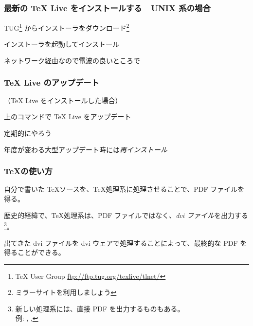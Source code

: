 \begin{frame}
	\frametitle{最新の {\TeX} Live をインストールする---UNIX 系の場合}
	TUG\footnote{{\TeX} User Group \url{ftp://ftp.tug.org/texlive/tlnet/}}
	からインストーラをダウンロード\footnote{ミラーサイトを利用しましょう}\\
	
	インストーラを起動してインストール\\
	
	ネットワーク経由なので電波の良いところで
\end{frame}

\begin{frame}
	\frametitle{{\TeX} Live のアップデート}
	（{\TeX} Live をインストールした場合）
	
	
	上のコマンドで {\TeX} Live をアップデート
	
	定期的にやろう
	
	年度が変わる大型アップデート時には\emph{再インストール}
\end{frame}


\begin{frame}
	\frametitle{\TeX の使い方}
	自分で書いた \TeX ソースを、\TeX 処理系に処理させることで、PDF ファイルを得る。\par
	\pause
	\par
	\pause
	歴史的経緯で、\TeX 処理系は、PDF ファイルではなく、\emph{dvi ファイル}を出力する
	\footnote{新しい処理系には、直接 PDF を出力するものもある。\\例: \pdfTeX, \LuaTeX, \XeTeX}。
	
	出てきた dvi ファイルを dvi ウェアで処理することによって、最終的な PDF を得ることができる。
\end{frame}

